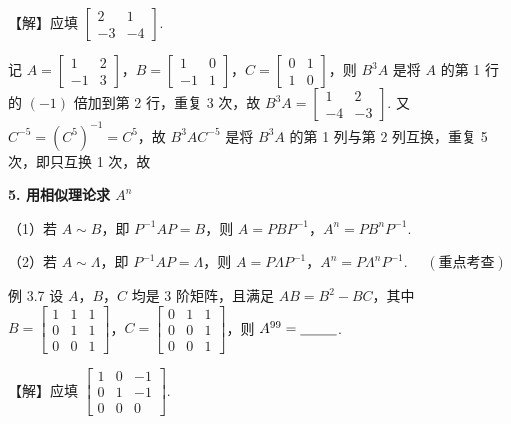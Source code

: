 【解】应填 $\begin{bmatrix}2&1\\-3&-4\end{bmatrix}$.

记 $A=\begin{bmatrix}1&2\\-1&3\end{bmatrix}$，$B=\begin{bmatrix}1&0\\-1&1\end{bmatrix}$，$C=\begin{bmatrix}0&1\\1&0\end{bmatrix}$，则 $B^3A$ 是将 $A$ 的第 1 行的 $(-1)$ 倍加到第 2 行，重复 3 次，故 $B^3A=\begin{bmatrix}1&2\\-4&-3\end{bmatrix}$. 又 $C^{-5}=(C^5)^{-1}=C^5$，故 $B^3AC^{-5}$ 是将 $B^3A$ 的第 1 列与第 2 列互换，重复 5 次，即只互换 1 次，故

\textbf{5. 用相似理论求 $A^n$}

（1）若 $A\sim B$，即 $P^{-1}AP=B$，则 $A=PBP^{-1}$，$A^n=PB^nP^{-1}$.

（2）若 $A\sim\Lambda$，即 $P^{-1}AP=\Lambda$，则 $A=P\Lambda P^{-1}$，$A^n=P\Lambda^nP^{-1}$. $\quad(\text{重点考查})$

\begin{fcard}{例 3.7}
设 $A$，$B$，$C$ 均是 3 阶矩阵，且满足 $AB=B^2-BC$，其中 $B=\begin{bmatrix}1&1&1\\0&1&1\\0&0&1\end{bmatrix}$，$C=\begin{bmatrix}0&1&1\\0&0&1\\0&0&1\end{bmatrix}$，则 $A^{99}=\underline{\hspace{2.6em}}$.
\end{fcard}

【解】应填 $\begin{bmatrix}1&0&-1\\0&1&-1\\0&0&0\end{bmatrix}$.


